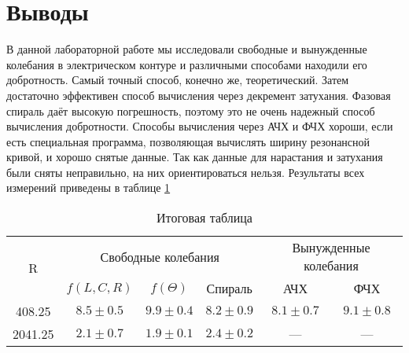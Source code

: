 \section{Выводы}

 В данной лабораторной работе мы исследовали свободные и вынужденные колебания в электрическом контуре и различными способами находили его добротность. Самый точный способ, конечно же, теоретический. Затем достаточно эффективен способ вычисления через декремент затухания. Фазовая спираль даёт высокую погрешность, поэтому это не очень надежный способ вычисления добротности. Способы вычисления через АЧХ и ФЧХ хороши, если есть специальная программа, позволяющая вычислять ширину резонансной кривой, и хорошо снятые данные. Так как данные для нарастания и затухания были сняты неправильно, на них ориентироваться нельзя. Результаты всех измерений приведены в таблице \ref{tab:7}
 \begin{table}
    \centering
    \begin{tabular}{|c|c|c|c|c|c|}
        \hline
        \multirow{2}{*}{R} & \multicolumn{3}{c}{Свободные колебания} & \multicolumn{2}{|c|}{Вынужденные колебания} \\
        \cline{2-6}
        & $f(L,C,R)$ & $f(\Theta)$ & Спираль & АЧХ & ФЧХ \\
        \hline
        408.25 & $8.5 \pm 0.5$ & $9.9 \pm 0.4$ & $8.2 \pm 0.9$ & $8.1 \pm 0.7$ & $9.1 \pm 0.8$\\
        \hline
        2041.25 & $2.1 \pm 0.7$ & $1.9 \pm 0.1$ & $2.4 \pm 0.2$ & --- & ---\\
        \hline

    \end{tabular}
    \caption{Итоговая таблица}
    \label{tab:7}
 \end{table}

